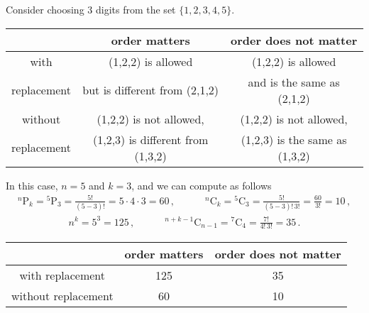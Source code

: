 \begin{ex}
Consider choosing $3$ digits from the set $\{1,2,3,4,5\}$. 
\begin{center}
\begin{tabular}{|c|c|c|}
\hline \rowcolor{lightgray}
 & order matters & order does not matter\\
\hline
\cellcolor{lightgray} with &(1,2,2) is allowed & (1,2,2) is allowed\\
\cellcolor{lightgray} replacement &  but is different from (2,1,2) &  and is the same as (2,1,2)\\
\hline
\cellcolor{lightgray} without &(1,2,2) is not allowed, & (1,2,2) is not allowed,\\
\cellcolor{lightgray} replacement & (1,2,3) is different from (1,3,2) &  (1,2,3) is the same as (1,3,2)\\
\hline
\end{tabular}
\end{center}

In this case, $n=5$ and $k=3$, and we can compute as follows
\begin{align*}
^n\text{P}_k = 
{}^5\text{P}_3 = \frac{5!}{(5-3)!} = 5\cdot 4 \cdot 3 = 60\,, \qquad\quad
^n\text{C}_k = {}^5\text{C}_3
=\frac{5!}{(5-3)!\, 3!} = \frac{60}{3!} = 10\,,
\end{align*}
\begin{align*}
n^k  = 5^3 = 125\,,
\qquad\quad
^{n+k-1}\text{C}_{n-1}=
{}^{7}\text{C}_{4} = \frac{7!}{4!\,3!} = 35\,.
\end{align*}
\begin{center}
\begin{tabular}{|c|c|c|}
\hline \rowcolor{lightgray}
 & order matters & order does not matter\\
\hline
\cellcolor{lightgray} with replacement & 125 & 35\\
\hline
\cellcolor{lightgray} without replacement & 60 & 10\\
\hline
\end{tabular}
\end{center}

\end{ex}


